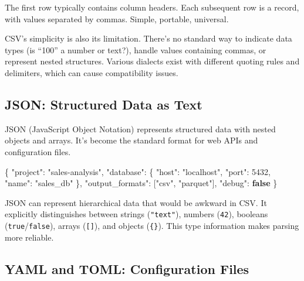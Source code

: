 \documentclass[
  letterpaper,
  DIV=11,
  numbers=noendperiod]{scrreprt}
\newenvironment{Shaded}{\begin{snugshade}}{\end{snugshade}}
\newcommand{\DataTypeTok}[1]{\textcolor[rgb]{0.68,0.00,0.00}{#1}}
\newcommand{\DecValTok}[1]{\textcolor[rgb]{0.68,0.00,0.00}{#1}}
\newcommand{\FunctionTok}[1]{\textcolor[rgb]{0.28,0.35,0.67}{#1}}
\newcommand{\KeywordTok}[1]{\textcolor[rgb]{0.00,0.23,0.31}{\textbf{#1}}}
\newcommand{\OtherTok}[1]{\textcolor[rgb]{0.00,0.23,0.31}{#1}}
\newcommand{\StringTok}[1]{\textcolor[rgb]{0.13,0.47,0.30}{#1}}
\begin{document}
The first row typically contains column headers. Each subsequent row is
a record, with values separated by commas. Simple, portable, universal.

CSV's simplicity is also its limitation. There's no standard way to
indicate data types (is ``100'' a number or text?), handle values
containing commas, or represent nested structures. Various dialects
exist with different quoting rules and delimiters, which can cause
compatibility issues.

\subsection{JSON: Structured Data as
Text}\label{json-structured-data-as-text}

JSON (JavaScript Object Notation) represents structured data with nested
objects and arrays. It's become the standard format for web APIs and
configuration files.

\begin{codelisting}

\caption{\texttt{config.json}}

\begin{Shaded}
\begin{Highlighting}[]
\FunctionTok{\{}
  \DataTypeTok{"project"}\FunctionTok{:} \StringTok{"sales{-}analysis"}\FunctionTok{,}
  \DataTypeTok{"database"}\FunctionTok{:} \FunctionTok{\{}
    \DataTypeTok{"host"}\FunctionTok{:} \StringTok{"localhost"}\FunctionTok{,}
    \DataTypeTok{"port"}\FunctionTok{:} \DecValTok{5432}\FunctionTok{,}
    \DataTypeTok{"name"}\FunctionTok{:} \StringTok{"sales\_db"}
  \FunctionTok{\},}
  \DataTypeTok{"output\_formats"}\FunctionTok{:} \OtherTok{[}\StringTok{"csv"}\OtherTok{,} \StringTok{"parquet"}\OtherTok{]}\FunctionTok{,}
  \DataTypeTok{"debug"}\FunctionTok{:} \KeywordTok{false}
\FunctionTok{\}}
\end{Highlighting}
\end{Shaded}

\end{codelisting}

JSON can represent hierarchical data that would be awkward in CSV. It
explicitly distinguishes between strings (\texttt{"text"}), numbers
(\texttt{42}), booleans (\texttt{true}/\texttt{false}), arrays
(\texttt{{[}{]}}), and objects (\texttt{\{\}}). This type information
makes parsing more reliable.

\subsection{YAML and TOML: Configuration
Files}\label{yaml-and-toml-configuration-files}
\end{document}

